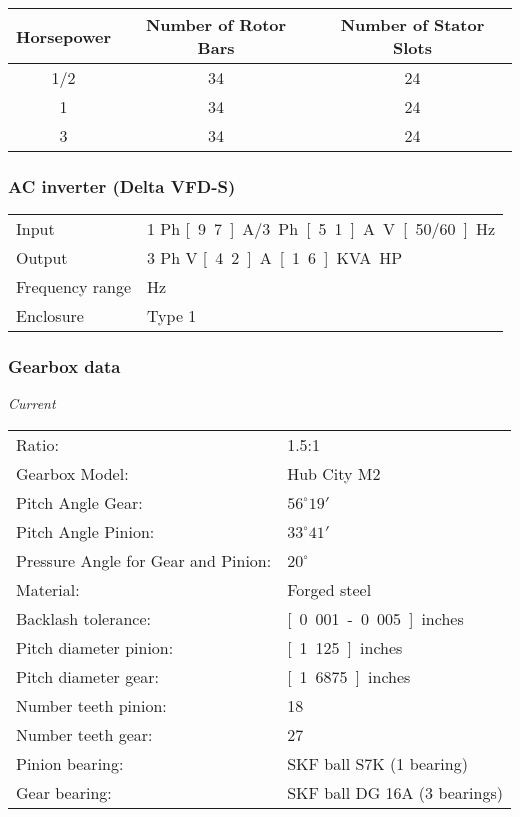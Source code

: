 \documentclass[a4paper,11pt]{report}
\begin{document}
\begin{tabular}{|c|c|c|}
\hline
Horsepower & Number of Rotor Bars & Number of Stator Slots \\
\hline
1/2 & 34 & 24 \\
1 & 34 & 24 \\
3 & 34 & 24 \\
\hline
\end{tabular}

\subsubsection{AC inverter (Delta VFD-S)}
\begin{tabular}{ll}
Input & 1 Ph \unit[9.7]{A}/3 Ph \unit[5.1]{A} \unit[200-240]{V} \unit[50/60]{Hz}\\
Output & 3 Ph \unit[0-240]{V} \unit[4.2]{A} \unit[1.6]{KVA} \unit[1]{HP}\\
Frequency range & \unit[1-400]{Hz}\\
Enclosure & Type 1
\end{tabular}

\subsubsection{Gearbox data}
\textsl{Current}\\

\begin{tabular}{ll}
Ratio: & 1.5:1 \\
Gearbox Model: & Hub City M2\\
Pitch Angle Gear: & $56^{\circ} 19'$\\
Pitch Angle Pinion: & $33^{\circ} 41'$\\
Pressure Angle for Gear and Pinion: & $20^{\circ}$ \\
Material: & Forged steel\\
Backlash tolerance: & \unit[0.001-0.005]{inches}\\
Pitch diameter pinion: & \unit[1.125]{inches}\\
Pitch diameter gear: & \unit[1.6875]{inches} \\
Number teeth pinion: & 18 \\
Number teeth gear: & 27 \\
Pinion bearing: & SKF ball S7K (1 bearing)\\
Gear bearing: & SKF ball DG 16A (3 bearings)
\end{tabular} \\
\end{document}
